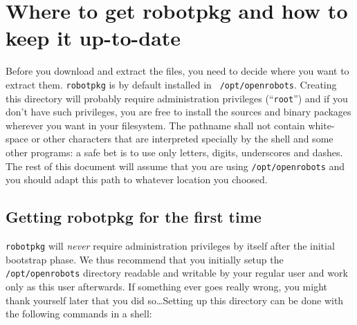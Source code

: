 %
%
%
%
%


\section{Where to get robotpkg and how to keep it up-to-date} %
\label{section:getting}

Before you download and extract the files, you need to decide where you want to
extract  them.     {\tt   robotpkg}  is     by  default   installed   in   {\tt
/opt/openrobots}. Creating this directory  will probably require administration
privileges (``{\tt root}'') and if you don't have such privileges, you are free
to  install the   sources  and  binary   packages wherever you  want  in   your
filesystem. The pathname shall not contain white-space or other characters that
are interpreted specially  by the shell and some  other programs: a safe bet is
to use only letters, digits, underscores and dashes.  The rest of this document
will assume that you are using {\tt /opt/openrobots}  and you should adapt this
path to whatever location you choosed.


\subsection{Getting robotpkg for the first time} %

{\tt robotpkg}   will {\em never} require   administration privileges by itself
after the initial bootstrap phase.  We thus  recommend that you initially setup
the {\tt /opt/openrobots} directory readable and writable  by your regular user
and work only as this  user afterwards.  If  something ever goes really  wrong,
you might thank yourself later that you did so\ldots  Setting up this directory
can be done with the following commands in a shell:

